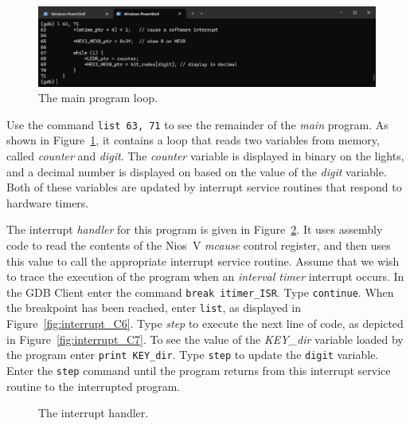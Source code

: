 \documentclass[11pt, twoside, pdftex]{article}
\newcommand{\red}[1]{{\color{red}\sf{#1}}}
\begin{document}
\begin{figure}[h]
    \begin{center}
        \includegraphics[scale=.6]{figures/interrupt_C5.png}
        \caption{The main program loop.}
        \label{fig:interrupt_C5}
    \end{center}
\end{figure}

Use the command \texttt{list 63, 71} to see the remainder of the {\it main} program. As shown in
Figure~\ref{fig:interrupt_C5}, it contains a 
loop that reads two variables from memory, called {\it counter} and {\it digit}.  The
{\it counter} variable is displayed in binary on the \red{\it LEDR} lights, and a decimal 
number is displayed on \red{\it HEX0} based on the value of the {\it digit} variable.
Both of these variables are updated by interrupt service routines that respond to hardware 
timers.

The interrupt {\it handler} for this program is given in Figure~\ref{fig:interrupt_code}.
It uses assembly code to read the contents of the Nios~V {\it mcause} control register, and then
uses this value to call the appropriate interrupt service routine. Assume that we wish to
trace the execution of the program when an {\it interval timer} interrupt occurs. In the
GDB Client enter the command \texttt{break itimer\_ISR}. Type \texttt{continue}. When the
breakpoint has been reached, enter \texttt{list}, as displayed in
Figure~\ref{fig:interrupt_C6}. Type {\it step} to execute the next line of code, as
depicted in Figure~\ref{fig:interrupt_C7}. To see the value of the {\it KEY\_dir} variable
loaded by the program enter \texttt{print KEY\_dir}. Type \texttt{step} to update the
\texttt{digit} variable. Enter the \texttt{step} command until the program returns from this 
interrupt service routine to the interrupted program.

\begin{figure}[H]

	\caption{The interrupt handler.}
	\label{fig:interrupt_code}
\end{figure}
\end{document}

